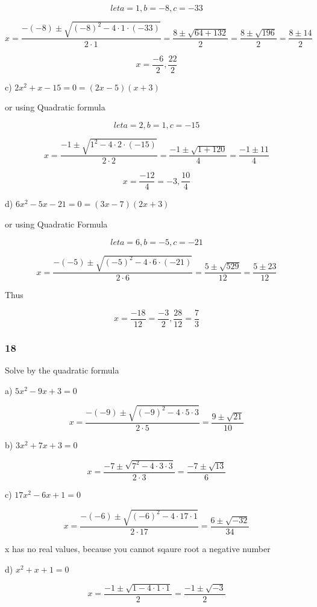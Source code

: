 \documentclass[]{report}
\begin{document}
\[
let a=1, b=-8, c= -33
\]

\[
x = \frac{-(-8) \pm \sqrt{(-8)^2 - 4\cdot1\cdot(-33)}}{2\cdot1} = \frac{8 \pm \sqrt{64  + 132}}{2} = \frac{8 \pm \sqrt{196}}{2} = \frac{8 \pm 14}{2}
\]

\[
x = \frac{-6}{2}, \frac{22}{2}
\]



c) $2x^2 + x -15 = 0 = (2x - 5)(x + 3)$


or  using Quadratic formula

\[
let a=2, b=1, c=-15
\]

\[
x = \frac{-1 \pm \sqrt{1^2 - 4\cdot2\cdot(-15)}}{2\cdot2} = \frac{-1 \pm \sqrt{1 + 120}}{4} = \frac{-1 \pm 11}{4}
\]

\[
x = \frac{-12}{4} = -3, \frac{10}{4}
\]

d) $6x^2 - 5x -21 = 0 = (3x - 7)(2x + 3)$

or using Quadratic Formula

\[
let a=6, b=-5, c=-21
\]

\[
x = \frac{-(-5) \pm \sqrt{(-5)^2 - 4\cdot6\cdot(-21)}}{2\cdot6} = \frac{5 \pm \sqrt{529}}{12} = \frac{5 \pm 23}{12}
\]

Thus

\[
x=\frac{-18}{12} = \frac{-3}{2}, \frac{28}{12} = \frac{7}{3}
\]



\subsubsection{18}

Solve by the quadratic formula

a) $5x^2 - 9x + 3 = 0 $

\[
x = \frac{-(-9) \pm \sqrt{(-9)^2 - 4\cdot5\cdot3}}{2\cdot5} = \frac{9 \pm \sqrt{21}}{10}
\]

b) $3x^2 + 7x + 3 = 0$

\[
x = \frac{-7 \pm \sqrt{7^2 - 4\cdot3\cdot3}}{2\cdot3} = \frac{-7 \pm \sqrt{13}}{6}
\]

c) $17x^2 - 6x + 1 = 0$

\[
x = \frac{-(-6) \pm \sqrt{(-6)^2 - 4\cdot17\cdot1}}{2\cdot17} = \frac{6 \pm \sqrt{-32}}{34}
\]

x has no real values, because you cannot sqaure root a negative number


d) $x^2 + x + 1 = 0$

\[
x = \frac{-1 \pm \sqrt{1 - 4\cdot1\cdot1}}{2} = \frac{-1 \pm \sqrt{-3}}{2}
\]
\end{document}
